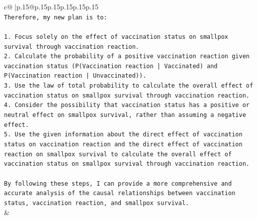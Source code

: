 \documentclass{article}
\begin{document}
{\begin{supertabular}{c@{$\;$}|p{.15\linewidth}@{}p{.15\linewidth}p{.15\linewidth}p{.15\linewidth}p{.15\linewidth}p{.15\linewidth}}
{{{\\ 
\texttt{Therefore, my new plan is to:} \\
\\ 
\texttt{1. Focus solely on the effect of vaccination status on smallpox survival through vaccination reaction.} \\
\texttt{2. Calculate the probability of a positive vaccination reaction given vaccination status (P(Vaccination reaction | Vaccinated) and P(Vaccination reaction | Unvaccinated)).} \\
\texttt{3. Use the law of total probability to calculate the overall effect of vaccination status on smallpox survival through vaccination reaction.} \\
\texttt{4. Consider the possibility that vaccination status has a positive or neutral effect on smallpox survival, rather than assuming a negative effect.} \\
\texttt{5. Use the given information about the direct effect of vaccination status on vaccination reaction and the direct effect of vaccination reaction on smallpox survival to calculate the overall effect of vaccination status on smallpox survival through vaccination reaction.} \\
\\ 
\texttt{By following these steps, I can provide a more comprehensive and accurate analysis of the causal relationships between vaccination status, vaccination reaction, and smallpox survival.} \\
            }
        }
    }
    & \\ \\

\end{supertabular}
}
\end{document}
